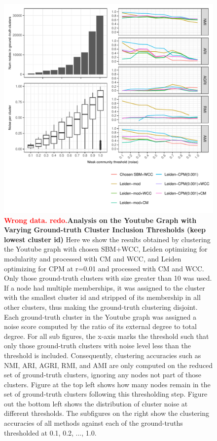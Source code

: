 \documentclass[aps,pre,superscriptaddress]{revtex4}
\begin{document}
\begin{figure}[!htpb]
	\centering
	\includegraphics[]{figures/accuracy_choose_lower.pdf}
	\caption[]{\textbf{\textcolor{red}{Wrong data. redo.}Analysis on the Youtube Graph with Varying Ground-truth Cluster Inclusion Thresholds (keep lowest cluster id)} Here we show the results obtained by clustering the Youtube graph with chosen SBM+WCC, Leiden optimizing for modularity and processed with CM and WCC, and Leiden optimizing for CPM at r=0.01 and processed with CM and WCC. Only those ground-truth clusters with size greater than 10 was used. If a node had multiple memberships, it was assigned to the cluster with the smallest cluster id and stripped of its membership in all other clusters, thus making the ground-truth clustering disjoint. Each ground-truth cluster in the Youtube graph was assigned a noise score computed by the ratio of its external degree to total degree. For all sub figures, the x-axis marks the threshold such that only those ground-truth clusters with noise level less than the threshold is included. Consequently, clustering accuracies such as NMI, ARI, AGRI, RMI, and AMI are only computed on the reduced set of ground-truth clusters, ignoring any nodes not part of those clusters. Figure at the top left shows how many nodes remain in the set of ground-truth clusters following this thresholding step. Figure out the bottom left shows the distribution of cluster noise at different thresholds. The subfigures on the right show the clustering accuracies of all methods against each of the ground-truths thresholded at 0.1, 0.2, ..., 1.0. }
	\label{fig:youtube-accuracy-choose-lower}
\end{figure}
\end{document}
